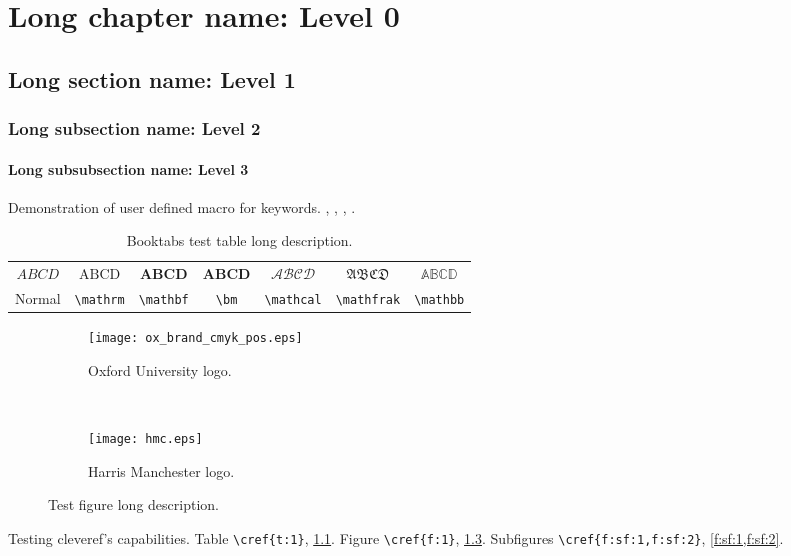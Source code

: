 \chapter[Short chapter name]{Long chapter name: Level 0}
\section[Short section name]{Long section name: Level 1}
\subsection[Short subsection name]{Long subsection name: Level 2}
\subsubsection[Short subsubsection name]{Long subsubsection name: Level 3}
Demonstration of user defined macro for keywords. , , , \cite{greenwade93}.

\begin{table}[htbp!]
	\centering
	\caption[Test table short description.]{Booktabs test table long description.}
	\label{t:1}
	\begin{tabular}{ccccccc}
		\toprule
		$ ABCD $ & $ \mathrm{ABCD} $      & $ \mathbf{ABCD} $      & $ \bm{ABCD} $          & $ \mathcal{ABCD} $     & $ \mathfrak{ABCD} $    & $ \mathbb{ABCD} $      \\
		\cmidrule{2-3}\morecmidrules\cmidrule{5-6}
		Normal   & \verb|\mathrm| & \verb|\mathbf| & \verb|\bm| & \verb|\mathcal| & \verb|\mathfrak| & \verb|\mathbb| \\
		\bottomrule
	\end{tabular}
\end{table}

\begin{figure}[htbp!]
	\centering
	\begin{subfigure}[c]{0.45\textwidth}
		\centering
		\texttt{[image: ox\_brand\_cmyk\_pos.eps]}
		\caption{Oxford University logo.}
		\label{f:sf:1}
	\end{subfigure}
	~
	\begin{subfigure}[c]{0.45\textwidth}
		\centering
		\texttt{[image: hmc.eps]}
		\caption{Harris Manchester logo.}
		\label{f:sf:2}
	\end{subfigure}
	\caption[Test figure short description.]{Test figure long description.}
	\label{f:1}
\end{figure}

Testing cleveref's capabilities. Table \verb|\cref{t:1}|, \cref{t:1}. Figure \verb|\cref{f:1}|, \cref{f:1}. Subfigures \verb|\cref{f:sf:1,f:sf:2}|, \cref{f:sf:1,f:sf:2}.
\savearabiccounter